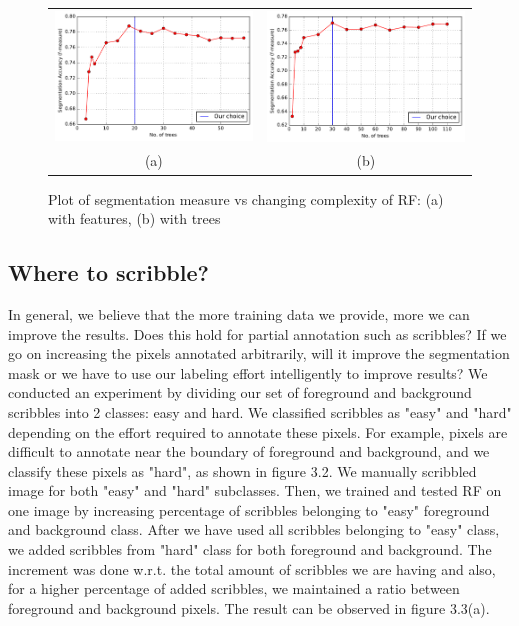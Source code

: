 \begin{figure}[h!] \label{fig:rf_complex}
\begin{tabular}{cc}
 \includegraphics[width=0.45\linewidth]{figures/diff_features.pdf} & \includegraphics[width=0.55\linewidth]{figures/diff_trees.pdf} \\
  (a)  & (b) \\
\end{tabular}
\caption{Plot of segmentation measure vs changing complexity of RF: (a) with features, (b) with trees}
\end{figure}


\subsection{Where to scribble?}
In general, we believe that the more training data we provide, more we can improve the results. Does this hold for partial annotation such as scribbles? If we go on increasing the pixels annotated arbitrarily, will it improve the segmentation mask or we have to use our labeling effort intelligently to improve results? We conducted an experiment by dividing our set of foreground and background scribbles into 2 classes: easy and hard. We classified scribbles as "easy" and "hard" depending on the effort required to annotate these pixels. For example, pixels are difficult to annotate near the boundary of foreground and background, and we classify these pixels as "hard", as shown in figure 3.2. We manually scribbled image for both "easy" and "hard" subclasses. Then, we trained and tested RF on one image by increasing percentage of scribbles belonging to "easy" foreground and background class. After we have used all scribbles belonging to "easy" class, we added scribbles from "hard" class for both foreground and background. The increment was done w.r.t. the total amount of scribbles we are having and also, for a higher percentage of added scribbles, we maintained a ratio between foreground and background pixels. The result can be observed in figure 3.3(a). \par



